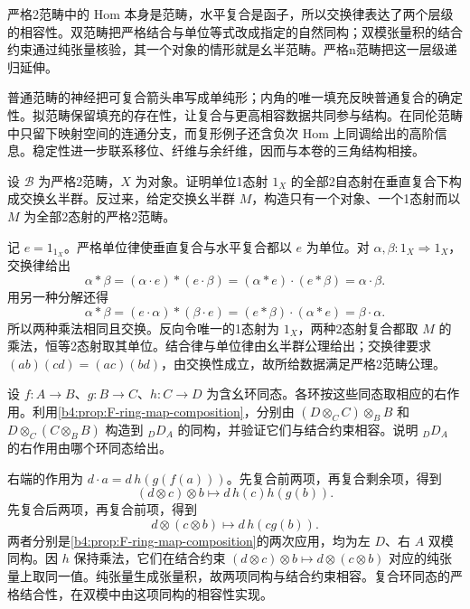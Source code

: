 




\begin{chaptersummary}
	严格2范畴中的 Hom 本身是范畴，水平复合是函子，所以交换律表达了两个层级的相容性。双范畴把严格结合与单位等式改成指定的自然同构；双模张量积的结合约束通过纯张量核验，其一个对象的情形就是幺半范畴。严格n范畴把这一层级递归延伸。

	\ProseParagraphBreak
	普通范畴的神经把可复合箭头串写成单纯形；内角的唯一填充反映普通复合的确定性。拟范畴保留填充的存在性，让复合与更高相容数据共同参与结构。在同伦范畴中只留下映射空间的连通分支，而复形例子还含负次 Hom 上同调给出的高阶信息。稳定性进一步联系移位、纤维与余纤维，因而与本卷的三角结构相接。
\end{chaptersummary}

\BookExercises

\begin{exercise}\label{b4:ex:F-unit-two-endomorphisms}
	设 \(\mathcal B\) 为严格2范畴，\(X\) 为对象。证明单位1态射 \(1_X\) 的全部2自态射在垂直复合下构成交换幺半群。反过来，给定交换幺半群 \(M\)，构造只有一个对象、一个1态射而以 \(M\) 为全部2态射的严格2范畴。
\end{exercise}
\begin{solution}
	记 \(e=1_{1_X}\)。严格单位律使垂直复合与水平复合都以 \(e\) 为单位。对 \(\alpha,\beta:1_X\Rightarrow1_X\)，交换律给出
	\[
		\alpha*\beta =(\alpha\cdot e)*(e\cdot\beta) =(\alpha*e)\cdot(e*\beta) =\alpha\cdot\beta.
	\]
	用另一种分解还得
	\[
		\alpha*\beta =(e\cdot\alpha)*(\beta\cdot e) =(e*\beta)\cdot(\alpha*e) =\beta\cdot\alpha.
	\]
	所以两种乘法相同且交换。反向令唯一的1态射为 \(1_X\)，两种2态射复合都取 \(M\) 的乘法，恒等2态射取其单位。结合律与单位律由幺半群公理给出；交换律要求 \((ab)(cd)=(ac)(bd)\)，由交换性成立，故所给数据满足严格2范畴公理。
\end{solution}

\begin{exercise}\label{b4:ex:F-ring-map-bimodule}
	设 \(f:A\rightarrow B\)、\(g:B\rightarrow C\)、\(h:C\rightarrow D\) 为含幺环同态。各环按这些同态取相应的右作用。利用\cref{b4:prop:F-ring-map-composition}，分别由 \((D\otimes_C C)\otimes_B B\) 和 \(D\otimes_C(C\otimes_B B)\) 构造到 \({}_DD_A\) 的同构，并验证它们与结合约束相容。说明 \({}_DD_A\) 的右作用由哪个环同态给出。
\end{exercise}
\begin{solution}
	右端的作用为 \(d\cdot a=d\,h(g(f(a)))\)。先复合前两项，再复合剩余项，得到
	\[
		(d\otimes c)\otimes b\longmapsto d\,h(c)h(g(b)).
	\]
	先复合后两项，再复合前项，得到
	\[
		d\otimes(c\otimes b)\longmapsto d\,h(cg(b)).
	\]
	两者分别是\cref{b4:prop:F-ring-map-composition}的两次应用，均为左 \(D\)、右 \(A\) 双模同构。因 \(h\) 保持乘法，它们在结合约束 \((d\otimes c)\otimes b\mapsto d\otimes(c\otimes b)\) 对应的纯张量上取同一值。纯张量生成张量积，故两项同构与结合约束相容。复合环同态的严格结合性，在双模中由这项同构的相容性实现。
\end{solution}

